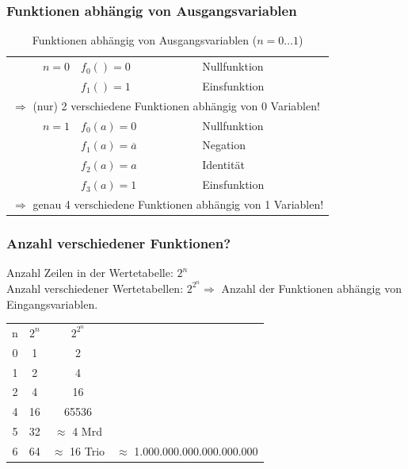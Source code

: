 \documentclass[10pt,a4paper]{scrartcl}
\begin{document}
\subsubsection{Funktionen abhängig von Ausgangsvariablen}
\begin{table}[h!]
	\centering
	\begin{tabular}{|r|l|l|}
	\hline
	$ n = 0 $ & $ f_0() = 0 $ & \glqq Nullfunktion\grqq{} \\
					 & $ f_1() = 1 $ & \glqq Einsfunktion\grqq{} \\ \hline
\multicolumn{3}{|l|}{$ \Rightarrow $ (nur) 2 verschiedene Funktionen abhängig von 0 Variablen!}\\ \hline
	$ n = 1 $ & $ f_0(a) = 0 $ & \glqq Nullfunktion\grqq{} \\
					 & $ f_1(a) = \overline{a} $ & \glqq Negation\grqq{} \\
					 & $ f_2(a) = a $ & \glqq Identität\grqq{} \\
					 & $ f_3(a) = 1 $ & \glqq Einsfunktion\grqq{} \\ \hline
 \multicolumn{3}{|l|}{$ \Rightarrow $ genau 4 verschiedene Funktionen abhängig von 1 Variablen!}\\ \hline
\end{tabular}
\label{tab:funktionenausgang}
\caption{Funktionen abhängig von Ausgangsvariablen ($ n = 0 \ldots 1 $)}
\end{table}
\FloatBarrier

\subsubsection*{Anzahl verschiedener Funktionen?}
Anzahl Zeilen in der Wertetabelle: $ 2^n $\\
Anzahl verschiedener Wertetabellen: $ 2^{2^{n}} \Rightarrow $ Anzahl der Funktionen abhängig von Eingangsvariablen.
\\
\begin{center}
	\begin{minipage}{0.45\textwidth}
	\begin{tabular}{cccl}
		n & $ 2^n $ & $ 2^{2^{n}} $& \\ \cline{1-3}
		0 & 1 & 2 &\\
		1 & 2 & 4 &\\
		2 & 4 & 16&\\
		4 & 16 & 65536&\\
		5 & 32 & $ \approx $ 4 Mrd&\\
		6 & 64 & $ \approx $ 16 Trio & $ \approx $ 1.000.000.000.000.000.000
	\end{tabular}
\end{minipage}
\begin{minipage}{0.2\textwidth}
\end{minipage}
\end{center}
\end{document}
